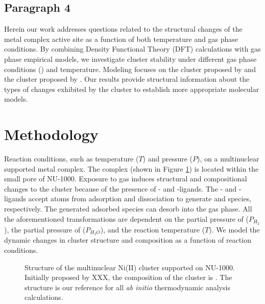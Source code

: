 \documentclass[journal=jctcce,manuscript=article]{achemso}
\begin{document}
\subsection{Paragraph 4}
Herein our work addresses questions related to the structural changes of the metal complex active site as a function of both temperature and gas phase conditions. By combining Density Functional Theory (DFT) calculations with gas phase empirical models, we investigate cluster stability under different gas phase conditions () and temperature. Modeling focuses on the  cluster proposed by \citeauthor{PlateroPrats2017} and the  cluster proposed by \cite{Ikuno2017}. Our results provide structural information about the types of changes exhibited by the cluster to establish more appropriate molecular models. 


\newpage
\section{Methodology}
Reaction conditions, such as temperature ($T$) and pressure ($P$), on a multinuclear  supported metal complex. The  complex (shown in Figure \ref{fig:ref_Ni4_structure}) is located within the small pore of NU-1000. Exposure to  gas induces structural and compositional changes to the cluster because of the presence of - and -ligands. The - and - ligands accept  atoms from  adsorption and dissociation to generate  and  species, respectively. The generated adsorbed  species can desorb into the gas phase. All the aforementioned transformations are dependent on the partial pressure of  ($P_{H_2}$), the partial pressure of  ($P_{H_{2}O}$), and the reaction temperature ($T$). We model the dynamic changes in cluster structure and composition as a function of reaction conditions. 

\begin{figure}
    \centering
    \caption{Structure of the multinuclear Ni(II) cluster supported on NU-1000. Initially proposed by XXX, the composition of the cluster is . The structure is our reference for all \textit{ab initio} thermodynamic analysis calculations.}
    \label{fig:ref_Ni4_structure}
\end{figure}
\end{document}
